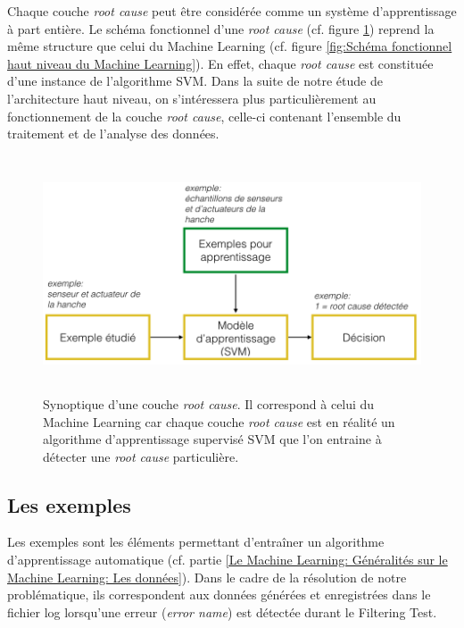 Chaque couche \emph{root cause} peut être considérée comme un système d'apprentissage à part entière. Le schéma fonctionnel d'une \emph{root cause} (cf. figure 	\ref{fig:Synoptique d'une couche root cause}) reprend la même structure que celui du Machine Learning (cf. figure \ref{fig:Schéma fonctionnel haut niveau du Machine Learning}). En effet, chaque \emph{root cause} est constituée d'une instance de l'algorithme SVM. Dans la suite de notre étude de l'architecture haut niveau, on s'intéressera plus particulièrement  au fonctionnement de la couche \emph{root cause}, celle-ci contenant l'ensemble du traitement et de l'analyse des données.

\begin{figure}[h]
	\centering\includegraphics[height=7cm]{images/exemple_root.png}
	\caption[Synoptique d'une couche root cause]{Synoptique d'une couche \emph{root cause}. Il correspond à celui du Machine Learning car chaque couche \emph{root cause} est en réalité un algorithme d'apprentissage supervisé SVM que l'on entraine à détecter une \emph{root cause} particulière.}
	\label{fig:Synoptique d'une couche root cause}
\end{figure}

\subsection{Les exemples}
\label{Automatisation du processus d'investigation: Achitecture High Level du système proposé: Les exemples}
Les exemples sont les éléments permettant d'entraîner un algorithme d'apprentissage automatique (cf. partie \ref{Le Machine Learning: Généralités sur le Machine Learning: Les données}). Dans le cadre de la résolution de notre problématique, ils correspondent aux données générées et enregistrées dans le fichier log lorsqu'une erreur (\emph{error name}) est détectée durant le Filtering Test.

